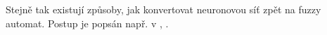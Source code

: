 \documentclass[a4paper,10pt]{article}
\begin{document}
Stejně tak existují způsoby, jak konvertovat neuronovou síť zpět na fuzzy automat. Postup je popsán např. v \cite{BlaDelFlo-MethIndFuzzAutUsNeuNet}, \cite{BlaDelPeg-FuzzGraIntUsiNeuNet}. 

% 
% 
% 
% 
% 
% 

% 
% 
% 
% 
% 
% 
% 
% 
\end{document}
